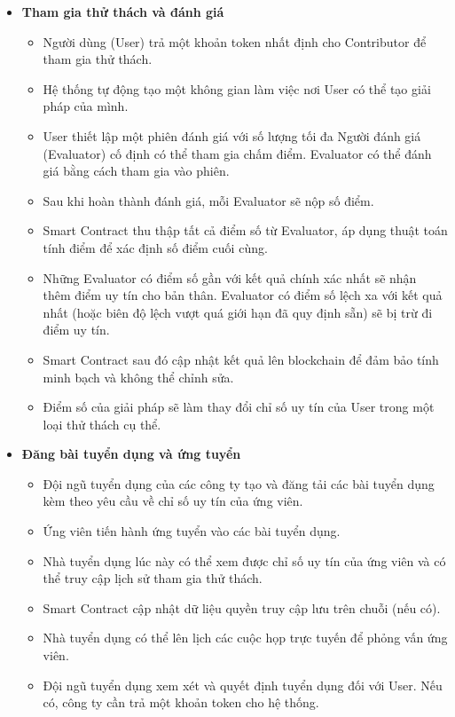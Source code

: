 \begin{itemize}
  \item \textbf{Tham gia thử thách và đánh giá}
        \begin{itemize}
          \item Người dùng (User) trả một khoản token nhất định cho Contributor để tham gia thử thách.
          \item Hệ thống tự động tạo một không gian làm việc nơi User có thể tạo giải pháp của mình.
          \item User thiết lập một phiên đánh giá với số lượng tối đa Người đánh giá (Evaluator) cố định có thể tham gia chấm điểm. Evaluator có thể đánh giá bằng cách tham gia vào phiên.
          \item Sau khi hoàn thành đánh giá, mỗi Evaluator sẽ nộp số điểm.
          \item Smart Contract thu thập tất cả điểm số từ Evaluator, áp dụng thuật toán tính điểm để xác định số điểm cuối cùng.
          \item Những Evaluator có điểm số gần với kết quả chính xác nhất sẽ nhận thêm điểm uy tín cho bản thân. Evaluator có điểm số lệch xa với kết quả nhất (hoặc biên độ lệch vượt quá giới hạn đã quy định sẵn) sẽ bị trừ đi điểm uy tín.
          \item Smart Contract sau đó cập nhật kết quả lên blockchain để đảm bảo tính minh bạch và không thể chỉnh sửa.
          \item Điểm số của giải pháp sẽ làm thay đổi chỉ số uy tín của User trong một loại thử thách cụ thể.
        \end{itemize}

  \item \textbf{Đăng bài tuyển dụng và ứng tuyển}
        \begin{itemize}
          \item Đội ngũ tuyển dụng của các công ty tạo và đăng tải các bài tuyển dụng kèm theo yêu cầu về chỉ số uy tín của ứng viên.
          \item Ứng viên tiến hành ứng tuyển vào các bài tuyển dụng.
          \item Nhà tuyển dụng lúc này có thể xem được chỉ số uy tín của ứng viên và có thể truy cập lịch sử tham gia thử thách.
          \item Smart Contract cập nhật dữ liệu quyền truy cập lưu trên chuỗi (nếu có).
          \item Nhà tuyển dụng có thể lên lịch các cuộc họp trực tuyến để phỏng vấn ứng viên.
          \item Đội ngũ tuyển dụng xem xét và quyết định tuyển dụng đối với User. Nếu có, công ty cần trả một khoản token cho hệ thống.
        \end{itemize}
\end{itemize}

